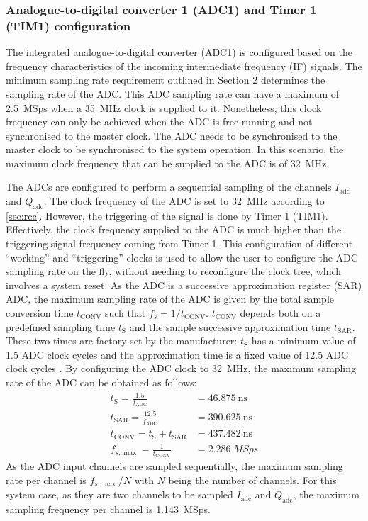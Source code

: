 \subsubsection{Analogue-to-digital converter 1 (ADC1) and Timer 1 (TIM1) configuration} \label{sec:adc_tim_config_v_vector}

The integrated analogue-to-digital converter (ADC1) is configured based on the frequency characteristics of the incoming intermediate frequency (IF) signals. The minimum sampling rate requirement outlined in Section 2 determines the sampling rate of the ADC. This ADC sampling rate can have a maximum of \SI{2.5}{MSps} when a \SI{35}{\mega\hertz} clock is supplied to it. Nonetheless, this clock frequency can only be achieved when the ADC is free-running and not synchronised to the master clock. The ADC needs to be synchronised to the master clock to be synchronised to the system operation. In this scenario, the maximum clock frequency that can be supplied to the ADC is of \SI{32}{\mega\hertz}.

The ADCs are configured to perform a sequential sampling of the channels $I_{\mathrm{adc}}$ and $Q_{\mathrm{adc}}$. The clock frequency of the ADC is set to  \SI{32}{\mega\hertz} according to \cref{sec:rcc}. However, the triggering of the signal is done by Timer 1 (TIM1). Effectively, the clock frequency supplied to the ADC is much higher than the triggering signal frequency coming from Timer 1. This configuration of different ``working'' and ``triggering'' clocks is used to allow the user to configure the ADC sampling rate on the fly, without needing to reconfigure the clock tree, which involves a system reset. As the ADC is a successive approximation register (SAR) ADC, the maximum sampling rate of the ADC is given by the total sample conversion time $t_\mathrm{CONV}$ such that $f_s = 1/t_\mathrm{CONV}$. $t_\mathrm{CONV}$ depends both on a predefined sampling time $t_\mathrm{S}$ and the sample successive approximation time $t_\mathrm{SAR}$. These two times are factory set by the manufacturer: $t_\mathrm{S}$ has a minimum value of 1.5 ADC clock cycles and the approximation time is a fixed value of 12.5 ADC clock cycles \cite[p.~104]{STMicroelectronics2022}.
By configuring the ADC clock to \SI{32}{\mega\hertz}, the maximum sampling rate of the ADC can be obtained as follows:
\begin{align}
	t_\mathrm{S} = \frac{1.5}{f_\mathrm{ADC}} &= \SI{46.875}{\nano\second}\\
	t_\mathrm{SAR} = \frac{12.5}{f_\mathrm{ADC}}
	&= \SI{390.625}{\nano\second}\\
	t_\mathrm{CONV} = t_\mathrm{S} + t_\mathrm{SAR} &= \SI{437.482}{\nano\second}\\
	f_{s,\max} = \frac{1}{t_\mathrm{CONV}} &= \SI{2.286}{MSps}
\end{align}
As the ADC input channels are sampled sequentially, the maximum sampling rate per channel is $f_{s,\max}/N$ with $N$ being the number of channels. For this system case, as they are two channels to be sampled $I_{\mathrm{adc}}$ and $Q_{\mathrm{adc}}$, the maximum sampling frequency per channel is \SI{1.143}{MSps}.

